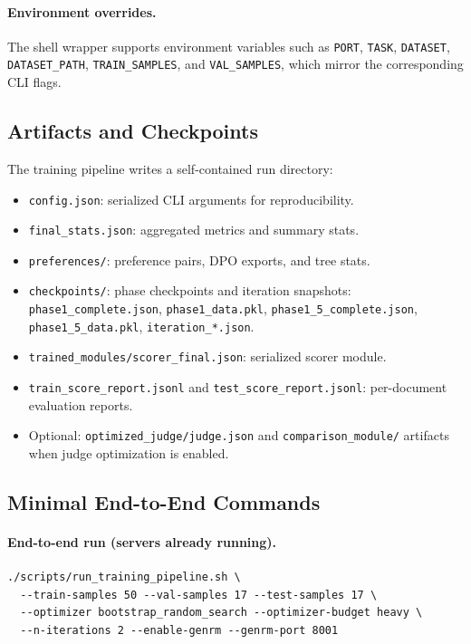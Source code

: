 \paragraph{Environment overrides.}
The shell wrapper supports environment variables such as \texttt{PORT},
\texttt{TASK}, \texttt{DATASET}, \texttt{DATASET\_PATH}, \texttt{TRAIN\_SAMPLES},
and \texttt{VAL\_SAMPLES}, which mirror the corresponding CLI flags.

\subsection{Artifacts and Checkpoints}

The training pipeline writes a self-contained run directory:
\begin{itemize}[nosep]
    \item \texttt{config.json}: serialized CLI arguments for reproducibility.
    \item \texttt{final\_stats.json}: aggregated metrics and summary stats.
    \item \texttt{preferences/}: preference pairs, DPO exports, and tree stats.
    \item \texttt{checkpoints/}: phase checkpoints and iteration snapshots:
          \texttt{phase1\_complete.json}, \texttt{phase1\_data.pkl},
          \texttt{phase1\_5\_complete.json}, \texttt{phase1\_5\_data.pkl},
          \texttt{iteration\_*.json}.
    \item \texttt{trained\_modules/scorer\_final.json}: serialized scorer module.
    \item \texttt{train\_score\_report.jsonl} and \texttt{test\_score\_report.jsonl}:
          per-document evaluation reports.
    \item Optional: \texttt{optimized\_judge/judge.json} and
          \texttt{comparison\_module/} artifacts when judge optimization is enabled.
\end{itemize}

\subsection{Minimal End-to-End Commands}

\paragraph{End-to-end run (servers already running).}
\begin{lstlisting}
./scripts/run_training_pipeline.sh \
  --train-samples 50 --val-samples 17 --test-samples 17 \
  --optimizer bootstrap_random_search --optimizer-budget heavy \
  --n-iterations 2 --enable-genrm --genrm-port 8001
\end{lstlisting}

